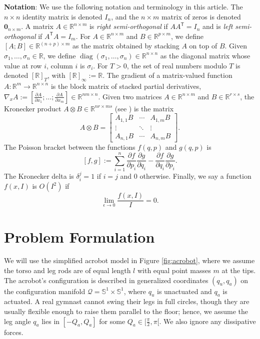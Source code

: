 \documentclass[journal,twoside,web]{ieeecolor}
\DeclareMathOperator{\Diag}{diag}
\newcommand*{\diag}[1]{\Diag\left(#1\right)}
\newcommand*{\tpose}{^\mathsf{T}}
\newcommand*{\Rt}[1]{[\R]_{#1}}
\newcommand*{\R}{\mathbb{R}}
\newcommand*{\Sone}{\mathbb{S}^1}
\newcommand*{\Id}[1]{I_{#1}}
\newcommand*{\Zmat}[1]{\bm{0}_{#1}}
\newcommand*{\pdiff}[2]{\frac{\partial #1}{\partial #2}}
\begin{document}
\textbf{Notation}:
We use the following notation and terminology in this article.
The \(n \times n\) identity matrix is denoted \(\Id{n}\), and the \(n \times m\)
matrix of zeros is denoted \(\Zmat{n\times m}\).
A matrix \(A \in \R^{n \times m}\) is \textit{right semi-orthogonal} if
\(A A\tpose = \Id{n}\) and is \textit{left semi-orthogonal} if 
\(A\tpose A = \Id{m}\).
For \(A \in \R^{n\times m}\) and \(B \in \R^{p \times m}\),
we define \([A;B] \in \R^{(n+p)\times m}\) as the matrix obtained by stacking \(A\)
on top of \(B\). 
Given \(\sigma_1,\ldots,\sigma_n \in \R\), we define 
\(\diag{\sigma_1,\ldots,\sigma_n} \in \R^{n \times n}\) as the diagonal matrix
whose value at row \(i\), column \(i\) is \(\sigma_i\).
For \(T > 0\), the set of real numbers modulo \(T\) is denoted \(\Rt{T}\), with
\(\Rt{\infty} := \R\).
The gradient of a matrix-valued function 
\(A : \R^m \rightarrow \R^{n\times n}\) is the block matrix of stacked partial
derivatives, 
\(\nabla_xA := [\pdiff{A}{x_1};\ldots;\pdiff{A}{x_m}] \in \R^{nm \times n}\).
Given two matrices \(A \in \R^{n \times m}\) and \(B \in \R^{r \times s}\), the
Kronecker product \(A \otimes B \in \R^{nr \times ms}\) (see \cite{kronprod}) is
the matrix
\begin{equation}\label{eqn:kronprod}
    A \otimes B = \begin{bmatrix}
        A_{1,1}B & \cdots & A_{1,m} B \\
        \vdots & \ddots & \vdots \\
        A_{n,1} B & \cdots & A_{n,m} B
    \end{bmatrix} 
    .
\end{equation}
The Poisson bracket \cite{landau_mechanics} between the functions
\(f(q,p)\) and \(g(q,p)\) is
\begin{equation}\label{eqn:poisson-bracket}
    [f,g] := \sum \limits_{i=1}^n \pdiff{f}{p_i}\pdiff{g}{q_i} - 
        \pdiff{f}{q_i}\pdiff{g}{p_i}
    .
\end{equation}
The Kronecker delta is \(\delta_i^j = 1\) if \(i = j\) and \(0\)
otherwise.
Finally, we say a function \(f(x,I)\) is \(O(I^2)\)
if
\[
    \lim\limits_{\epsilon \to 0} \frac{f(x,I)}{I} = 0
    .
\]

\section{Problem Formulation}\label{sec:problem-formulation}
We will use the simplified acrobot model in Figure
\ref{fig:acrobot}, where we assume the torso and leg rods are of
equal length \(l\) with equal point masses \(m\) at the tips.
The acrobot's configuration is described in generalized coordinates
\((q_u,q_a)\) on the configuration manifold 
\(\mathcal{Q} = \Sone \times \Sone\), where \(q_u\) is unactuated and 
\(q_a\) is actuated.
A real gymnast cannot swing their legs in full circles, though they
are usually flexible enough to raise them parallel to the floor;
hence, we assume the leg angle \(q_a\) lies in \([-Q_a, Q_a]\) for some
\(Q_a \in [\frac{\pi}{2}, \pi[\). 
We also ignore any dissipative forces.
\end{document}
